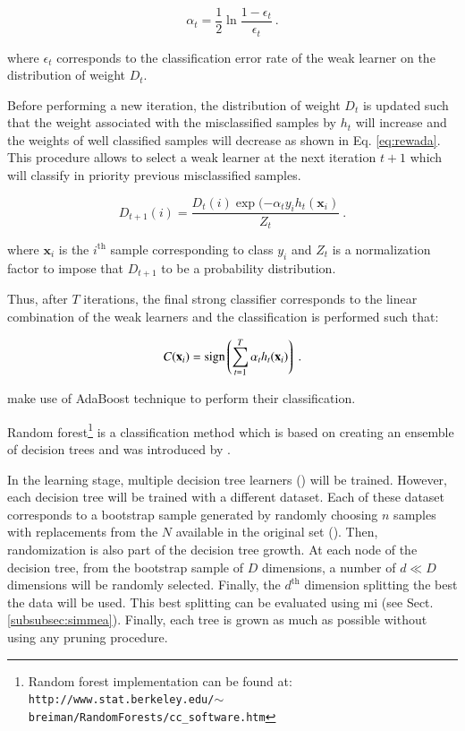 \begin{enumerate}[leftmargin=*]
\begin{equation}
	\alpha_t = \frac{1}{2} \ln \frac{1 - \epsilon_t}{\epsilon_t} \ .
	\label{eq:wclssada}
\end{equation}

\noindent where $\epsilon_t$ corresponds to the classification error rate of the weak learner on the distribution of weight $D_t$.

Before performing a new iteration, the distribution of weight $D_t$ is updated such that the weight associated with the misclassified samples by $h_t$ will increase and the weights of well classified samples will decrease as shown in Eq. \ref{eq:rewada}. This procedure allows to select a weak learner at the next iteration $t+1$ which will classify in priority previous misclassified samples.

\begin{equation}
	D_{t+1}(i) = \frac{ D_t(i) \exp(-\alpha_t y_i h_{t}(\mathbf{x}_{i} ) }{ Z_t  } \ .
	\label{eq:rewada} 
\end{equation}

\noindent where $\mathbf{x}_i$ is the $i^{\text{th}}$ sample corresponding to class $y_i$ and $Z_t$ is a normalization factor to impose that $D_{t+1}$ to be a probability distribution.

Thus, after $T$ iterations, the final strong classifier corresponds to the linear combination of the weak learners and the classification is performed such that:

\begin{equation}
	C(\mathbf{x}_i) = \operatorname*{sign} \left( \sum_{t=1}^{T} \alpha_t h_t(\mathbf{x}_i) \right) \ .
	\label{eq:strclaada}
\end{equation}

\cite{Lopes2011} make use of AdaBoost technique to perform their classification.

Random forest\footnote{Random forest implementation can be found at: \texttt{http://www.stat.berkeley.edu/\allowbreak $\sim$breiman/RandomForests/cc\_software.htm}} is a classification method which is based on creating an ensemble of decision trees and was introduced by \cite{Breiman2001}.

In the learning stage, multiple decision tree learners (\cite{Breiman1984}) will be trained. However, each decision tree will be trained with a different dataset. Each of these dataset corresponds to a bootstrap sample generated by randomly choosing $n$ samples with replacements from the $N$ available in the original set (\cite{Efron1979}). Then, randomization is also part of the decision tree growth. At each node of the decision tree, from the bootstrap sample of $D$ dimensions, a number of $d \ll D$ dimensions will be randomly selected. Finally, the $d^{\text{th}}$ dimension splitting the best the data will be used. This best splitting can be evaluated using \ac{mi} (see Sect. \ref{subsubsec:simmea}). Finally, each tree is grown as much as possible without using any pruning procedure.


\end{enumerate}
